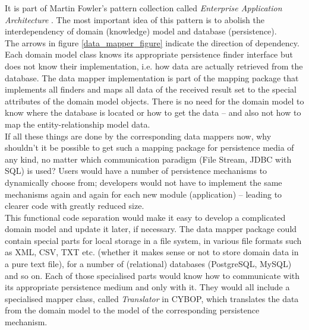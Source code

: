 It is part of Martin Fowler's pattern collection called \emph{Enterprise Application
Architecture} \cite{fowler2002}. The most important idea of this pattern is to
abolish the interdependency of domain (knowledge) model and database (persistence).\\
The arrows in figure \ref{data_mapper_figure} indicate the direction of dependency.
Each domain model class knows its appropriate persistence finder interface but
does not know their implementation, i.e. how data are actually retrieved from
the database. The data mapper implementation is part of the mapping package that
implements all finders and maps all data of the received result set to the special
attributes of the domain model objects.
There is no need for the domain model to know where the database is located or
how to get the data -- and also not how to map the entity-relationship model data.\\
If all these things are done by the corresponding data mappers now, why shouldn't
it be possible to get such a mapping package for persistence media of any kind,
no matter which communication paradigm (File Stream, JDBC with SQL) is used?
Users would have a number of persistence mechanisms to dynamically choose from;
developers would not have to implement the same mechanisms again and again for
each new module (application) -- leading to clearer code with greatly reduced size.\\
This functional code separation would make it easy to develop a complicated
domain model and update it later, if necessary. The data mapper package could
contain special parts for local storage in a file system, in various file formats
such as XML, CSV, TXT etc. (whether it makes sense or not to store domain data
in a pure text file), for a number of (relational) databases (PostgreSQL, MySQL)
and so on.
Each of those specialised parts would know how to communicate with its appropriate
persistence medium and only with it. They would all include a specialised mapper
class, called \emph{Translator} in CYBOP, which translates the data from the
domain model to the model of the corresponding persistence mechanism.

